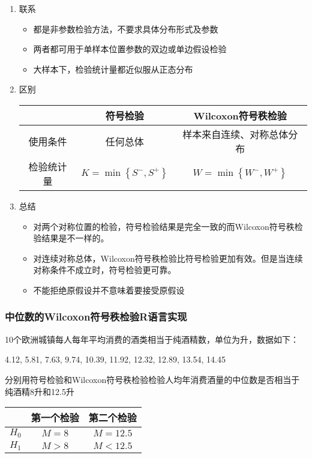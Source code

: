 \documentclass[UTF8]{ctexart}
\numberwithin{equation}{section}
\begin{document}
\begin{enumerate}
    \item 联系
    \begin{itemize}
        \item 都是非参数检验方法，不要求具体分布形式及参数
        \item 两者都可用于单样本位置参数的双边或单边假设检验
        \item 大样本下，检验统计量都近似服从正态分布
    \end{itemize}
    \item 区别
    \begin{center}
        \begin{tabular}{ccc}
            \toprule
            & 符号检验 & Wilcoxon符号秩检验\\
            \midrule
            使用条件 & 任何总体 & 样本来自连续、对称总体分布\\
            检验统计量 & $K = \min{\left\{ S^-, S^+ \right\}}$ & $W = \min{\left\{ W^-, W^+ \right\}}$\\
            \bottomrule
        \end{tabular}
    \end{center}
    \item 总结
    \begin{itemize}
        \item 对两个对称位置的检验，符号检验结果是完全一致的而Wilcoxon符号秩检验结果是不一样的。
        \item 对连续对称总体，Wilcoxon符号秩检验比符号检验更加有效。但是当连续对称条件不成立时，符号检验更可靠。
        \item 不能拒绝原假设并不意味着要接受原假设
    \end{itemize}
\end{enumerate}

\subsubsection{中位数的Wilcoxon符号秩检验R语言实现}

10个欧洲城镇每人每年平均消费的酒类相当于纯酒精数，单位为升，数据如下：
\begin{center}
    4.12, 5.81, 7.63, 9.74, 10.39, 11.92, 12.32, 12.89, 13.54, 14.45
\end{center}

分别用符号检验和Wilcoxon符号秩检验检验人均年消费酒量的中位数是否相当于纯酒精8升和12.5升

\begin{center}
    \begin{tabular}{ccc}
        \toprule
         & 第一个检验 & 第二个检验\\
        \midrule
        $H_0$ & $M = 8$ & $M = 12.5$\\
        $H_1$ & $M > 8$ & $M < 12.5$\\
        \bottomrule
    \end{tabular}
\end{center}
\end{document}
